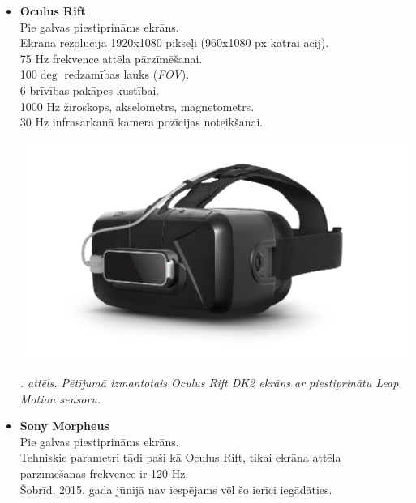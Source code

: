 \documentclass[12pt, a4paper, oneside, openright]{article}
\renewcommand{\thecimages}{\arabic{cimages}}
\begin{document}
\begin{itemize}
\item \textbf{Oculus Rift} \hfill \\
Pie galvas piestiprināms ekrāns.\\
Ekrāna rezolūcija 1920x1080 pikseļi (960x1080 px katrai acij).\\
75 Hz frekvence attēla pārzīmēšanai.\\
100$\deg$ redzamības lauks (\textit{FOV}).\\
6 brīvības pakāpes kustībai.\\
1000 Hz žiroskops, akselometrs, magnetometrs.\\
30 Hz infrasarkanā kamera pozīcijas noteikšanai.

\label{cimages:OculusLeap.png.png}
\vspace{10pt}
\begin{samepage}
\begin{center}
\includegraphics[width=0.8\columnwidth]{images/OculusLeap.png}
\begin{center}
\footnotesize{
\textit{\thecimages. attēls. Pētījumā izmantotais Oculus Rift DK2 ekrāns ar piestiprinātu Leap Motion sensoru.}}
\end{center}
\end{center}
\end{samepage}


\item \textbf{Sony Morpheus} \hfill \\
Pie galvas piestiprināms ekrāns.\\
Tehniskie parametri tādi paši kā Oculus Rift, 
tikai ekrāna attēla pārzīmēšanas frekvence ir 120 Hz. \\
Šobrīd, 2015. gada jūnijā nav iespējams vēl šo ierīci iegādāties.


\end{itemize}
\end{document}
